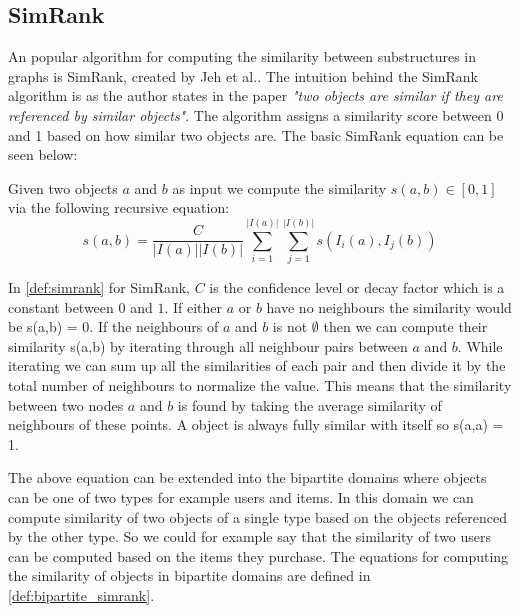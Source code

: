 \subsection{SimRank}
An popular algorithm for computing the similarity between substructures in graphs is SimRank, created by Jeh et al.\cite{10.1145/775047.775126}. The intuition behind the SimRank algorithm is as the author states in the paper \emph{"two objects are similar if they are referenced by similar objects"}\cite{10.1145/775047.775126}. The algorithm assigns a similarity score between 0 and 1 based on how similar two objects are. The basic SimRank equation can be seen below:
\begin{definition}[SimRank]\label{def:simrank} Given two objects $a$ and $b$ as input we compute the similarity $s(a,b) \in [0,1]$ via the following recursive equation:
	\begin{equation}\label{eq:basic_simrank}
	s(a,b)= \frac{C}{|I(a)||I(b)|}\sum^{|I(a)|}_{i=1}\sum^{|I(b)|}_{j=1}s(I_i(a),I_j(b))
	\end{equation}
\end{definition}
In \autoref{def:simrank} for SimRank, $C$ is the confidence level or decay factor which is a constant between $0$ and $1$. If either $a$ or $b$ have no neighbours the similarity would be s(a,b) = 0. If the neighbours of $a$ and $b$  is not $\emptyset$ then we can compute their similarity s(a,b) by iterating through all neighbour pairs between $a$ and $b$. While iterating we can sum up all the similarities of each pair and then divide it by the total number of neighbours to normalize the value. This means that the similarity between two nodes $a$ and $b$ is found by taking the average similarity of neighbours of these points. A object is always fully similar with itself so s(a,a) = 1.

The above equation can be extended into the bipartite domains where objects can be one of two types for example users and items. In this domain we can compute similarity of two objects of a single type based on the objects referenced by the other type. So we could for example say that the similarity of two users can be computed based on the items they purchase. The equations for computing the similarity of objects in bipartite domains are defined in \autoref{def:bipartite_simrank}.

